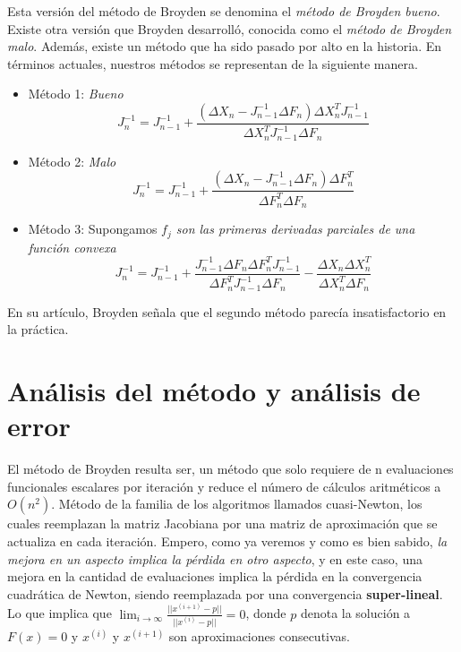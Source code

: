 \documentclass[12pt]{article}
\begin{document}
Esta versión del método de Broyden se denomina el \textit{método de Broyden bueno}. Existe otra versión que Broyden desarrolló, conocida como el \textit{método de Broyden malo}. Además, existe un método que ha sido pasado por alto en la historia. En términos actuales, nuestros métodos se representan de la siguiente manera.

\begin{itemize}
    \item Método 1: \textit{Bueno}
        \begin{equation*}
            J_n^{-1} = J_{n-1}^{-1} + \frac{(\Delta X_n - J_{n-1}^{-1} \Delta F_n) \Delta X_n^T J_{n-1}^{-1}}{\Delta X_n^T J_{n-1}^{-1} \Delta F_n}
        \end{equation*}
    \item Método 2: \textit{Malo}
        \begin{equation*}
            J_n^{-1} = J_{n-1}^{-1} + \frac{(\Delta X_n - J_{n-1}^{-1} \Delta F_n) \Delta F_n^T}{\Delta F_n^T \Delta F_n}
        \end{equation*}
    \item Método 3: Supongamos \textit{$f_j$ son las primeras       derivadas parciales de una función convexa}
        \begin{equation*}
            J_n^{-1} = J_{n-1}^{-1} + \frac{J_{n-1}^{-1} \Delta F_n \Delta F_n^T J_{n-1}^{-1}}{\Delta F_n^T J_{n-1}^{-1} \Delta F_n} - \frac{\Delta X_n \Delta X_n^T}{\Delta X_n^T \Delta F_n}
        \end{equation*}
\end{itemize}

En su artículo, Broyden señala que el segundo método parecía insatisfactorio en la práctica.

\section{Análisis del método y análisis de error}

El método de Broyden resulta ser, un método que solo requiere de n evaluaciones funcionales escalares por iteración y reduce el número de cálculos aritméticos a $O(n^2)$. Método de la familia de los algoritmos llamados cuasi-Newton, los cuales reemplazan la matriz Jacobiana por una matriz de aproximación que se actualiza en cada iteración. Empero, como ya veremos y como es bien sabido, \textit{la mejora en un aspecto implica la pérdida en otro aspecto}, y en este caso, una mejora en la cantidad de evaluaciones implica la pérdida en la convergencia cuadrática de Newton, siendo reemplazada por una convergencia \textbf{super-lineal}. Lo que implica que $\lim_{i \to \infty} \frac{||x^{(i+1)} - p||}{||x^{(i)} - p||} = 0$, donde $p$ denota la solución a $F(x) = 0$ y $x^{(i)}$ y $x^{(i+1)}$ son aproximaciones consecutivas.
\end{document}
